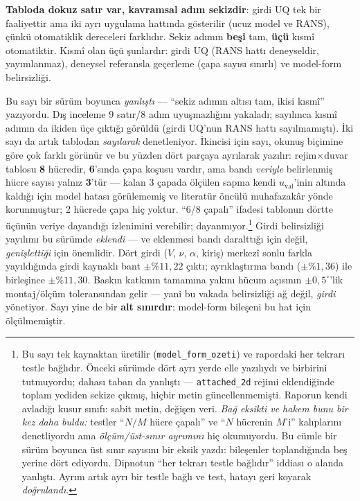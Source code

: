 \documentclass[11pt,a4paper]{article}
\begin{document}
\noindent \textbf{Tabloda dokuz satır var, kavramsal adım sekizdir}:
girdi UQ tek bir faaliyettir ama iki ayrı uygulama hattında gösterilir (ucuz
model ve RANS), çünkü otomatiklik dereceleri farklıdır. Sekiz adımın
\textbf{beşi} tam, \textbf{üçü} kısmî otomatiktir. Kısmî olan üçü şunlardır:
girdi UQ (RANS hattı deneyseldir, yayımlanmaz), deneysel referansla geçerleme
(çapa sayısı sınırlı) ve model-form belirsizliği.

\noindent Bu sayı bir sürüm boyunca \emph{yanlıştı} --- ``sekiz adımın altısı
tam, ikisi kısmî'' yazıyordu. Dış inceleme 9 satır/8 adım uyuşmazlığını
yakaladı; sayılınca kısmî adımın da ikiden üçe çıktığı görüldü (girdi UQ'nun
RANS hattı sayılmamıştı). İki sayı da artık tablodan \emph{sayılarak}
denetleniyor. İkincisi için sayı, okunuş biçimine göre çok farklı görünür ve
bu yüzden dört parçaya ayrılarak yazılır: rejim$\times$duvar tablosu \textbf{8}
hücredir, \textbf{6}'sında çapa koşusu vardır, ama bandı \emph{veriyle}
belirlenmiş hücre sayısı yalnız \textbf{3}'tür --- kalan 3 çapada ölçülen sapma
kendi $u_{\text{val}}$'inin altında kaldığı için model hatası görülememiş ve
literatür öncülü muhafazakâr yönde korunmuştur; 2 hücrede çapa hiç yoktur.
``6/8 çapalı'' ifadesi tablonun dörtte üçünün veriye dayandığı izlenimini
verebilir; dayanmıyor.\footnote{Bu sayı tek kaynaktan üretilir
(\texttt{model\_form\_ozeti}) ve rapordaki her tekrarı testle bağlıdır. Önceki
sürümde dört ayrı yerde elle yazılıydı ve birbirini tutmuyordu; dahası taban da
yanlıştı --- \texttt{attached\_2d} rejimi eklendiğinde toplam yediden sekize
çıkmış, hiçbir metin güncellenmemişti. Raporun kendi avladığı kusur sınıfı:
sabit metin, değişen veri. \emph{Bağ eksikti ve hakem bunu bir kez daha
buldu:} testler ``$N/M$ hücre çapalı'' ve ``$N$ hücrenin $M$'i'' kalıplarını
denetliyordu ama \emph{ölçüm/üst-sınır ayrımını} hiç okumuyordu. Bu cümle bir
sürüm boyunca üst sınır sayısını bir eksik yazdı: bileşenler toplandığında
beş yerine dört ediyordu. Dipnotun ``her tekrarı testle bağlıdır'' iddiası o
alanda yanlıştı.
Ayrım artık ayrı bir testle bağlı ve test, hatayı geri koyarak
\emph{doğrulandı}.} Girdi belirsizliği yayılımı bu sürümde \emph{eklendi} --- ve eklenmesi bandı
daralttığı için değil, \emph{genişlettiği} için önemlidir. Dört girdi ($V$,
$\nu$, $\alpha$, kiriş) merkezî sonlu farkla yayıldığında girdi kaynaklı bant
$\pm\%11{,}22$ çıktı; ayrıklaştırma bandı ($\pm\%1{,}36$) ile birleşince
$\pm\%11{,}30$. Baskın katkının tamamına yakını hücum açısının
$\pm0{,}5^\circ$'lik montaj/ölçüm toleransından gelir --- yani bu vakada
belirsizliği ağ değil, \emph{girdi} yönetiyor. Sayı yine de bir \textbf{alt
sınırdır}: model-form bileşeni bu hat için ölçülmemiştir.
\end{document}
